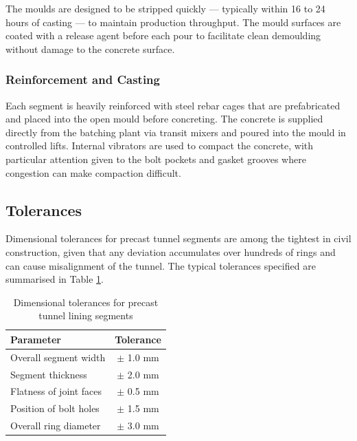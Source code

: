 \par\noindent
The moulds are designed to be stripped quickly --- typically within 16 to 24 hours of casting --- to maintain production throughput. The mould surfaces are coated with a release agent before each pour to facilitate clean demoulding without damage to the concrete surface.

\subsubsection{Reinforcement and Casting}
\par\noindent
Each segment is heavily reinforced with steel rebar cages that are prefabricated and placed into the open mould before concreting. The concrete is supplied directly from the batching plant via transit mixers and poured into the mould in controlled lifts. Internal vibrators are used to compact the concrete, with particular attention given to the bolt pockets and gasket grooves where congestion can make compaction difficult.

\subsection{Tolerances}
\par\noindent
Dimensional tolerances for precast tunnel segments are among the tightest in civil construction, given that any deviation accumulates over hundreds of rings and can cause misalignment of the tunnel. The typical tolerances specified are summarised in Table \ref{tab:tolerances}.

\begin{table}[ht]
    \centering
    \begin{tabular}{|l|c|}
        \hline
        \textbf{Parameter} & \textbf{Tolerance} \\
        \hline
        Overall segment width        & $\pm$ 1.0 mm \\
        Segment thickness            & $\pm$ 2.0 mm \\
        Flatness of joint faces      & $\pm$ 0.5 mm \\
        Position of bolt holes       & $\pm$ 1.5 mm \\
        Overall ring diameter        & $\pm$ 3.0 mm \\
        \hline
    \end{tabular}
    \caption{Dimensional tolerances for precast tunnel lining segments}
    \label{tab:tolerances}
\end{table}

